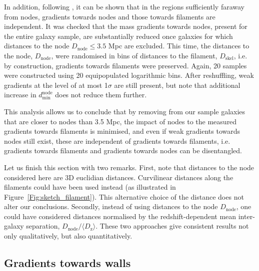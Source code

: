 \documentclass[useAMS,usenatbib]{mnras}
\begin{document}
In addition, following \cite{Laigle2017}, it can be shown that in the regions sufficiently faraway from nodes, gradients towards nodes and those towards filaments are independent. 
It was checked that the mass gradients towards nodes, present for the entire galaxy sample, are substantially reduced once galaxies for which distances to the node $D_{\mathrm{node}} \leq 3.5$ Mpc are excluded.
This time, the distances to the node, $D_{\mathrm{node}}$, were randomised in bins of distances to the filament, $D_{\mathrm{skel}}$, i.e. by construction, gradients towards filaments were preserved. Again, 20 samples were constructed using 20 equipopulated logarithmic bins. After reshuffling, weak gradients at the level of at most 1$\sigma$ are still present, but  note that additional increase in $d^{\mathrm{node}} _{\mathrm{min}}$ does not reduce them further.

This analysis allows us to conclude that by removing from our sample galaxies that are closer to nodes than 3.5 Mpc, the impact of nodes to the measured gradients towards filaments is minimised, and even if weak gradients towards nodes still exist, these are independent of gradients towards filaments, i.e. gradients towards filaments and gradients towards nodes can be disentangled. 

Let us finish this section with two remarks. First, note that distances to the node considered here are 3D euclidian distances. Curvilinear distances along the filaments could have been used instead (as illustrated in Figure~\ref{Fig:sketch_filament}). This alternative choice of the distance does not alter our conclusions.
%
Secondly, instead of using distances to the node $D_{\mathrm{node}}$, one could have considered distances normalised by the redshift-dependent mean inter-galaxy separation, $D_{\mathrm{node}}/\langle D_{\mathrm{z}} \rangle$. These two approaches give consistent results not only qualitatively, but also quantitatively. 


\subsection{Gradients towards walls}
\label{subsec:appendix_walls}
\end{document}
